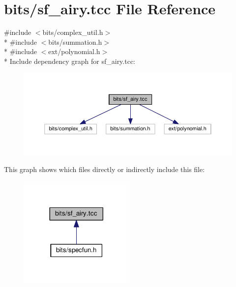 \hypertarget{sf__airy_8tcc}{}\section{bits/sf\+\_\+airy.tcc File Reference}
\label{sf__airy_8tcc}
{\ttfamily \#include $<$bits/complex\+\_\+util.\+h$>$}\\*
{\ttfamily \#include $<$bits/summation.\+h$>$}\\*
{\ttfamily \#include $<$ext/polynomial.\+h$>$}\\*
Include dependency graph for sf\+\_\+airy.\+tcc\+:
\nopagebreak
\begin{figure}[H]
\begin{center}
\leavevmode
\includegraphics[width=350pt]{sf__airy_8tcc__incl}
\end{center}
\end{figure}
This graph shows which files directly or indirectly include this file\+:
\nopagebreak
\begin{figure}[H]
\begin{center}
\leavevmode
\includegraphics[width=161pt]{sf__airy_8tcc__dep__incl}
\end{center}
\end{figure}
